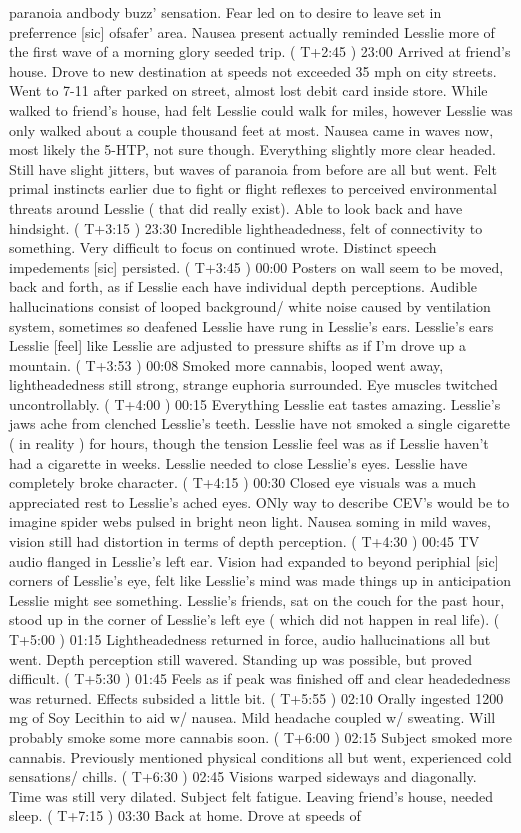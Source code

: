 \documentclass[12pt]{book}
\begin{document}
paranoia andbody buzz' sensation. Fear led on to desire to leave set in preferrence [sic] ofsafer' area. Nausea present actually reminded Lesslie more of the first wave of a morning glory seeded trip. ( T+2:45 ) 23:00 Arrived at friend's house. Drove to new destination at speeds not exceeded 35 mph on city streets. Went to 7-11 after parked on street, almost lost debit card inside store. While walked to friend's house, had felt Lesslie could walk for miles, however Lesslie was only walked about a couple thousand feet at most. Nausea came in waves now, most likely the 5-HTP, not sure though. Everything slightly more clear headed. Still have slight jitters, but waves of paranoia from before are all but went. Felt primal instincts earlier due to fight or flight reflexes to perceived environmental threats around Lesslie ( that did really exist). Able to look back and have hindsight. ( T+3:15 ) 23:30 Incredible lightheadedness, felt of connectivity to something. Very difficult to focus on continued wrote. Distinct speech impedements [sic] persisted. ( T+3:45 ) 00:00 Posters on wall seem to be moved, back and forth, as if Lesslie each have individual depth perceptions. Audible hallucinations consist of looped background/ white noise caused by ventilation system, sometimes so deafened Lesslie have rung in Lesslie's ears. Lesslie's ears Lesslie [feel] like Lesslie are adjusted to pressure shifts as if I'm drove up a mountain. ( T+3:53 ) 00:08 Smoked more cannabis, looped went away, lightheadedness still strong, strange euphoria surrounded. Eye muscles twitched uncontrollably. ( T+4:00 ) 00:15 Everything Lesslie eat tastes amazing. Lesslie's jaws ache from clenched Lesslie's teeth. Lesslie have not smoked a single cigarette ( in reality ) for hours, though the tension Lesslie feel was as if Lesslie haven't had a cigarette in weeks. Lesslie needed to close Lesslie's eyes. Lesslie have completely broke character. ( T+4:15 ) 00:30 Closed eye visuals was a much appreciated rest to Lesslie's ached eyes. ONly way to describe CEV's would be to imagine spider webs pulsed in bright neon light. Nausea soming in mild waves, vision still had distortion in terms of depth perception. ( T+4:30 ) 00:45 TV audio flanged in Lesslie's left ear. Vision had expanded to beyond periphial [sic] corners of Lesslie's eye, felt like Lesslie's mind was made things up in anticipation Lesslie might see something. Lesslie's friends, sat on the couch for the past hour, stood up in the corner of Lesslie's left eye ( which did not happen in real life). ( T+5:00 ) 01:15 Lightheadedness returned in force, audio hallucinations all but went. Depth perception still wavered. Standing up was possible, but proved difficult. ( T+5:30 ) 01:45 Feels as if peak was finished off and clear headededness was returned. Effects subsided a little bit. ( T+5:55 ) 02:10 Orally ingested 1200 mg of Soy Lecithin to aid w/ nausea. Mild headache coupled w/ sweating. Will probably smoke some more cannabis soon. ( T+6:00 ) 02:15 Subject smoked more cannabis. Previously mentioned physical conditions all but went, experienced cold sensations/ chills. ( T+6:30 ) 02:45 Visions warped sideways and diagonally. Time was still very dilated. Subject felt fatigue. Leaving friend's house, needed sleep. ( T+7:15 ) 03:30 Back at home. Drove at speeds of 
\end{document}
